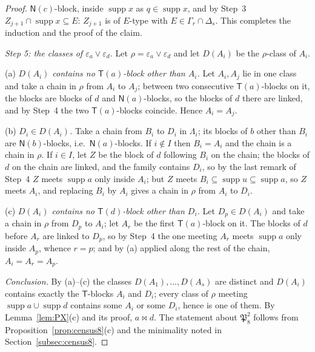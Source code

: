 \documentclass[11pt]{amsart}
\theoremstyle{definition}
\newcommand{\supp}{\operatorname{supp}}
\newcommand{\T}{\mathsf{T}}
\newcommand{\N}{\mathsf{N}}
\newcommand{\mt}{\bowtie}   %
\begin{document}
\begin{proof}
$\N(c)$-block, inside $\supp x$ as $q\in\supp x$, and by Step~3 $Z_{j+1}\cap\supp x\subseteq E$: $Z_{j+1}$ is of $E$-type with $E\in\Gamma_r\cap\Delta_s$. This completes the induction and the proof of the claim.

\smallskip
\emph{Step 5: the classes of $\varepsilon_a\vee\varepsilon_d$.} Let $\rho=\varepsilon_a\vee\varepsilon_d$ and let $D(A_i)$ be the $\rho$-class of $A_i$.

(a) \emph{$D(A_i)$ contains no $\T(a)$-block other than $A_i$.} Let $A_i,A_j$ lie in one class and take a chain in $\rho$ from $A_i$ to $A_j$; between two consecutive $\T(a)$-blocks on it, the blocks are blocks of $d$ and $\N(a)$-blocks, so the blocks of $d$ there are linked, and by Step~4 the two $\T(a)$-blocks coincide. Hence $A_i=A_j$.

(b) \emph{$D_i\in D(A_i)$.} Take a chain from $B_i$ to $D_i$ in $\Lambda_i$; its blocks of $b$ other than $B_i$ are $\N(b)$-blocks, i.e.\ $\N(a)$-blocks. If $i\notin I$ then $B_i=A_i$ and the chain is a chain in $\rho$. If $i\in I$, let $Z$ be the block of $d$ following $B_i$ on the chain; the blocks of $d$ on the chain are linked, and the family contains $D_i$, so by the last remark of Step~4 $Z$ meets $\supp a$ only inside $A_i$; but $Z$ meets $B_i\subseteq\supp u\subseteq\supp a$, so $Z$ meets $A_i$, and replacing $B_i$ by $A_i$ gives a chain in $\rho$ from $A_i$ to $D_i$.

(c) \emph{$D(A_i)$ contains no $\T(d)$-block other than $D_i$.} Let $D_p\in D(A_i)$ and take a chain in $\rho$ from $D_p$ to $A_i$; let $A_r$ be the first $\T(a)$-block on it. The blocks of $d$ before $A_r$ are linked to $D_p$, so by Step~4 the one meeting $A_r$ meets $\supp a$ only inside $A_p$, whence $r=p$; and by (a) applied along the rest of the chain, $A_i=A_r=A_p$.

\emph{Conclusion.} By (a)--(c) the classes $D(A_1),\dots,D(A_s)$ are distinct and $D(A_i)$ contains exactly the $\T$-blocks $A_i$ and $D_i$; every class of $\rho$ meeting $\supp a\cup\supp d$ contains some $A_i$ or some $D_i$, hence is one of them. By Lemma~\ref{lem:PX}(c) and its proof, $a\mt d$. The statement about $\mathfrak P_8^2$ follows from Proposition~\ref{prop:census8}(c) and the minimality noted in Section~\ref{subsec:census8}.
\end{proof}
\end{document}
